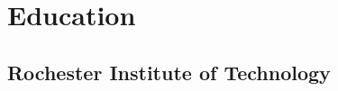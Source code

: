 \documentclass[letterpaper]{deedy-resume} %
\begin{document}
\begin{minipage}[t]{0.28\textwidth} %


\section{Education} 

\subsection{Rochester Institute of Technology}


\sectionspace %











\end{minipage}
\end{document}
